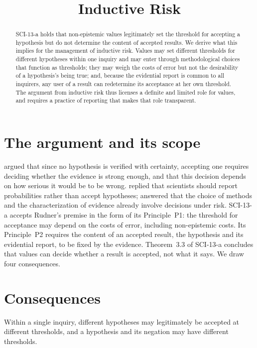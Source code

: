 \documentclass{situationist-preprint}
\title{Inductive Risk}
\begin{document}
\maketitle

\begin{abstract}
SCI-13-a holds that non-epistemic values legitimately set the threshold for accepting a hypothesis but do not determine the content of accepted results. We derive what this implies for the management of inductive risk. Values may set different thresholds for different hypotheses within one inquiry and may enter through methodological choices that function as thresholds; they may weigh the costs of error but not the desirability of a hypothesis's being true; and, because the evidential report is common to all inquirers, any user of a result can redetermine its acceptance at her own threshold. The argument from inductive risk thus licenses a definite and limited role for values, and requires a practice of reporting that makes that role transparent.
\end{abstract}

\section{The argument and its scope}

\citet{Rudner1953} argued that since no hypothesis is verified with certainty, accepting one requires deciding whether the evidence is strong enough, and that this decision depends on how serious it would be to be wrong. \citet{Jeffrey1956} replied that scientists should report probabilities rather than accept hypotheses; \citet{Douglas2000,Douglas2009} answered that the choice of methods and the characterization of evidence already involve decisions under risk. SCI-13-a accepts Rudner's premise in the form of its Principle~P1: the threshold for acceptance may depend on the costs of error, including non-epistemic costs. Its Principle~P2 requires the content of an accepted result, the hypothesis and its evidential report, to be fixed by the evidence. Theorem~3.3 of SCI-13-a concludes that values can decide whether a result is accepted, not what it says. We draw four consequences.

\section{Consequences}

\begin{corollary}\label{c:diff}
Within a single inquiry, different hypotheses may legitimately be accepted at different thresholds, and a hypothesis and its negation may have different thresholds.
\end{corollary}
\end{document}

